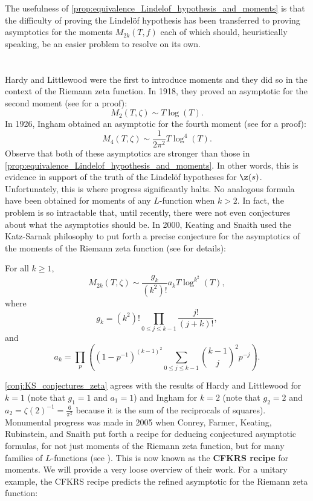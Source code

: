   The usefulness of \cref{prop:equivalence_Lindelof_hypothesis_and_moments} is that the difficulty of proving the Lindel\"of hypothesis has been transferred to proving asymptotics for the moments $M_{2k}(T,f)$ each of which should, heuristically speaking, be an easier problem to resolve on its own.
\section{}
  Hardy and Littlewood were the first to introduce moments and they did so in the context of the Riemann zeta function. In 1918, they proved an asymptotic for the second moment (see \cite{hardy1916contributions} for a proof):
  \[
    M_{2}(T,\zeta) \sim T\log(T).
  \]
  In 1926, Ingham obtained an asymptotic for the fourth moment (see \cite{ingham1928mean} for a proof):
  \[
    M_{4}(T,\zeta) \sim \frac{1}{2\pi^{2}}T\log^{4}(T).
  \]
  Observe that both of these asymptotics are stronger than those in \cref{prop:equivalence_Lindelof_hypothesis_and_moments}. In other words, this is evidence in support of the truth of the Lindel\"of hypotheses for $\z(s)$. Unfortunately, this is where progress significantly halts. No analogous formula have been obtained for moments of any $L$-function when $k > 2$. In fact, the problem is so intractable that, until recently, there were not even conjectures about what the asymptotics should be. In 2000, Keating and Snaith used the Katz-Sarnak philosophy to put forth a precise conjecture for the asymptotics of the moments of the Riemann zeta function (see \cite{keating2000random} for details):

  \begin{conjecture}\label{conj:KS_conjectures_zeta}
    For all $k \ge 1$,
    \[
      M_{2k}(T,\zeta) \sim \frac{g_{k}}{(k^{2})!}a_{k}T\log^{k^{2}}(T),
    \]
    where
    \[
      g_{k} = (k^{2})!\prod_{0 \le j \le k-1}\frac{j!}{(j+k)!},
    \]
    and
    \[
      a_{k} = \prod_{p}\left((1-p^{-1})^{(k-1)^{2}}\sum_{0 \le j \le k-1}\binom{k-1}{j}^{2}p^{-j}\right).
    \]
  \end{conjecture}
  
  \cref{conj:KS_conjectures_zeta} agrees with the results of Hardy and Littlewood for $k = 1$ (note that $g_{1} = 1$ and $a_{1} = 1$) and Ingham for $k = 2$ (note that $g_{2} = 2$ and $a_{2} = \zeta(2)^{-1} = \frac{6}{\pi^{2}}$ because it is the sum of the reciprocals of squares). Monumental progress was made in 2005 when Conrey, Farmer, Keating, Rubinstein, and Snaith put forth a recipe for deducing conjectured asymptotic formulas, for not just moments of the Riemann zeta function, but for many families of $L$-functions (see \cite{conrey2005integral}). This is now known as the \textbf{CFKRS recipe} for moments. We will provide a very loose overview of their work. For a unitary example, the CFKRS recipe predicts the refined asymptotic for the Riemann zeta function:

